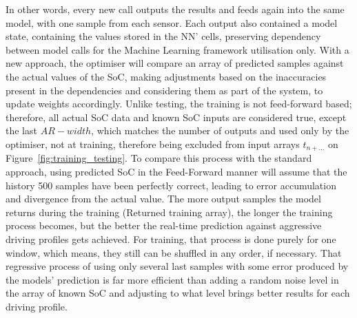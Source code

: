 %
%
In other words, every new call outputs the results and feeds again into the same model, with one sample from each sensor.
Each output also contained a model state, containing the values stored in the NN' cells, preserving dependency between model calls for the Machine Learning framework utilisation only.
With a new approach, the optimiser will compare an array of predicted samples against the actual values of the SoC, making adjustments based on the inaccuracies present in the dependencies and considering them as part of the system, to update weights accordingly.
Unlike testing, the training is not feed-forward based; therefore, all actual SoC data and known SoC inputs are considered true, except the last $AR-width$, which matches the number of outputs and used only by the optimiser, not at training, therefore being excluded from input arrays $t_{n+...}$ on Figure~\ref{fig:training_testing}.
To compare this process with the standard approach, using predicted SoC in the Feed-Forward manner will assume that the history 500 samples have been perfectly correct, leading to error accumulation and divergence from the actual value.
The more output samples the model returns during the training (Returned training array), the longer the training process becomes, but the better the real-time prediction against aggressive driving profiles gets achieved.
For training, that process is done purely for one window, which means, they still can be shuffled in any order, if necessary.
That regressive process of using only several last samples with some error produced by the models' prediction is far more efficient than adding a random noise level in the array of known SoC and adjusting to what level brings better results for each driving profile.
